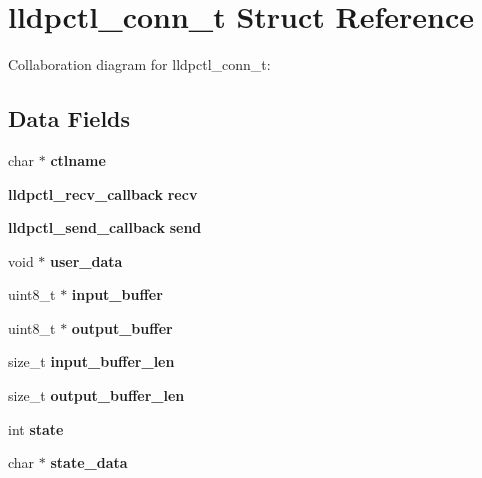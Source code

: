\section{lldpctl\-\_\-conn\-\_\-t \-Struct \-Reference}
\label{structlldpctl__conn__t}


\-Collaboration diagram for lldpctl\-\_\-conn\-\_\-t\-:
\subsection*{\-Data \-Fields}
\begin{DoxyCompactItemize}
\item 
char $\ast$ {\bfseries ctlname}\label{structlldpctl__conn__t_ad671ce2689cf5fba18b938dc8e8f0957}

\item 
{\bf lldpctl\-\_\-recv\-\_\-callback} {\bfseries recv}\label{structlldpctl__conn__t_ac586c9b07d47f6975351d6701503aae5}

\item 
{\bf lldpctl\-\_\-send\-\_\-callback} {\bfseries send}\label{structlldpctl__conn__t_ae14d36261ab7256923616f3ccbc111dd}

\item 
void $\ast$ {\bfseries user\-\_\-data}\label{structlldpctl__conn__t_a0f53d287ac7c064d1a49d4bd93ca1cb9}

\item 
uint8\-\_\-t $\ast$ {\bfseries input\-\_\-buffer}\label{structlldpctl__conn__t_ae871caa30d42adf5b8c4e1faa06e47f1}

\item 
uint8\-\_\-t $\ast$ {\bfseries output\-\_\-buffer}\label{structlldpctl__conn__t_a8137c63a33f95f6c6d52846efb036c97}

\item 
size\-\_\-t {\bfseries input\-\_\-buffer\-\_\-len}\label{structlldpctl__conn__t_ad0d30fc84a899d978028373d0aec88cc}

\item 
size\-\_\-t {\bfseries output\-\_\-buffer\-\_\-len}\label{structlldpctl__conn__t_aa94847f7dc7fd1dc1d49acea7212d372}

\item 
int {\bfseries state}\label{structlldpctl__conn__t_a89f234133d3efe315836311cbf21c64b}

\item 
char $\ast$ {\bfseries state\-\_\-data}\label{structlldpctl__conn__t_a3e731d5047ecd8316d950028f4c221e0}


\end{DoxyCompactItemize}
